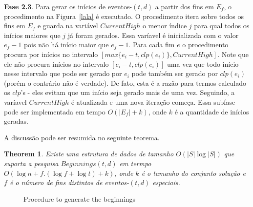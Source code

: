 \documentclass[12pt]{article}
\newtheorem{thm}{Theorem}[section]
\begin{document}
\textbf{Fase 2.3}. Para gerar os inícios de eventos-$(t,d)$ a partir dos fins em $E_f$, o procedimento
na Figura~\ref{lala} é executado. O procedimento itera sobre todos os fins em $E_f$ e guarda na variável
$CurrentHigh$ o menor índice $j$ para qual todos os inícios maiores que $j$ já foram gerados. 
Essa varíavel é inicializada com o valor $e_f - 1$ pois não há início maior que $e_f - 1$. Para
cada fim $e$ o procedimento procura por inícios no intervalo $[max\{e_i - t, clp(e_i)\}, CurrentHigh]$.
Note que ele não procura inícios no intervalo $[e_i - t, clp(e_i)]$ uma vez que todo início nesse
intervalo que pode ser gerado por $e_i$ pode também ser gerado por $clp(e_i)$ (porém o contrário
não é verdade). De fato, esta é a razão para termos calculado os $clp$'s - eles evitam que um 
início seja gerado mais de uma vez. Seguindo, a varíavel $CurrentHigh$ é atualizada e uma nova
iteração começa. Essa subfase pode ser implementada em tempo $O(|E_f| + k)$, onde $k$ é a quantidade
de inícios geradas. 

A discussão pode ser resumida no seguinte teorema.

\begin{thm}
Existe uma estrutura de dados de tamanho $O(|S|\log |S|)$ que suporta a pesquisa $Beginnings(t,d)$
em termpo $O(\log n + f.(\log f + \log t) + k)$, onde $k$ é o tamanho do conjunto solução e $f$ 
é o número de fins distintos de eventos-$(t, d)$ especiais. 
\end{thm}


\begin{figure}


\caption{Procedure to generate the beginnings}
\label{fig:beginnings} 
\normalsize

\end{figure}
\end{document}
